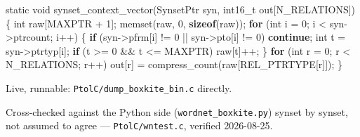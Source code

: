 \documentclass[
  10pt,
]{article}
\newenvironment{Shaded}{}{}
\newcommand{\ControlFlowTok}[1]{\textcolor[rgb]{0.00,0.44,0.13}{\textbf{#1}}}
\newcommand{\DataTypeTok}[1]{\textcolor[rgb]{0.56,0.13,0.00}{#1}}
\newcommand{\DecValTok}[1]{\textcolor[rgb]{0.25,0.63,0.44}{#1}}
\newcommand{\KeywordTok}[1]{\textcolor[rgb]{0.00,0.44,0.13}{\textbf{#1}}}
\newcommand{\NormalTok}[1]{#1}
\newcommand{\OperatorTok}[1]{\textcolor[rgb]{0.40,0.40,0.40}{#1}}
\begin{document}
\begin{Shaded}
\begin{Highlighting}[]
\DataTypeTok{static} \DataTypeTok{void}\NormalTok{ synset\_context\_vector}\OperatorTok{(}\NormalTok{SynsetPtr syn}\OperatorTok{,} \DataTypeTok{int16\_t}\NormalTok{ out}\OperatorTok{[}\NormalTok{N\_RELATIONS}\OperatorTok{])} \OperatorTok{\{}
    \DataTypeTok{int}\NormalTok{ raw}\OperatorTok{[}\NormalTok{MAXPTR }\OperatorTok{+} \DecValTok{1}\OperatorTok{];}
\NormalTok{    memset}\OperatorTok{(}\NormalTok{raw}\OperatorTok{,} \DecValTok{0}\OperatorTok{,} \KeywordTok{sizeof}\OperatorTok{(}\NormalTok{raw}\OperatorTok{));}
    \ControlFlowTok{for} \OperatorTok{(}\DataTypeTok{int}\NormalTok{ i }\OperatorTok{=} \DecValTok{0}\OperatorTok{;}\NormalTok{ i }\OperatorTok{\textless{}}\NormalTok{ syn}\OperatorTok{{-}\textgreater{}}\NormalTok{ptrcount}\OperatorTok{;}\NormalTok{ i}\OperatorTok{++)} \OperatorTok{\{}
        \ControlFlowTok{if} \OperatorTok{(}\NormalTok{syn}\OperatorTok{{-}\textgreater{}}\NormalTok{pfrm}\OperatorTok{[}\NormalTok{i}\OperatorTok{]} \OperatorTok{!=} \DecValTok{0} \OperatorTok{||}\NormalTok{ syn}\OperatorTok{{-}\textgreater{}}\NormalTok{pto}\OperatorTok{[}\NormalTok{i}\OperatorTok{]} \OperatorTok{!=} \DecValTok{0}\OperatorTok{)} \ControlFlowTok{continue}\OperatorTok{;}
        \DataTypeTok{int}\NormalTok{ t }\OperatorTok{=}\NormalTok{ syn}\OperatorTok{{-}\textgreater{}}\NormalTok{ptrtyp}\OperatorTok{[}\NormalTok{i}\OperatorTok{];}
        \ControlFlowTok{if} \OperatorTok{(}\NormalTok{t }\OperatorTok{\textgreater{}=} \DecValTok{0} \OperatorTok{\&\&}\NormalTok{ t }\OperatorTok{\textless{}=}\NormalTok{ MAXPTR}\OperatorTok{)}\NormalTok{ raw}\OperatorTok{[}\NormalTok{t}\OperatorTok{]++;}
    \OperatorTok{\}}
    \ControlFlowTok{for} \OperatorTok{(}\DataTypeTok{int}\NormalTok{ r }\OperatorTok{=} \DecValTok{0}\OperatorTok{;}\NormalTok{ r }\OperatorTok{\textless{}}\NormalTok{ N\_RELATIONS}\OperatorTok{;}\NormalTok{ r}\OperatorTok{++)}
\NormalTok{        out}\OperatorTok{[}\NormalTok{r}\OperatorTok{]} \OperatorTok{=}\NormalTok{ compress\_count}\OperatorTok{(}\NormalTok{raw}\OperatorTok{[}\NormalTok{REL\_PTRTYPE}\OperatorTok{[}\NormalTok{r}\OperatorTok{]]);}
\OperatorTok{\}}
\end{Highlighting}
\end{Shaded}

Live, runnable: \texttt{PtolC/dump\_boxkite\_bin.c} directly.

Cross-checked against the Python side (\texttt{wordnet\_boxkite.py})
synset by synset, not assumed to agree --- \texttt{PtolC/wntest.c},
verified 2026-08-25.
\end{document}
